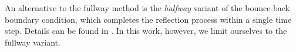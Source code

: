 An alternative to the fullway method is the \textit{halfway} variant of the bounce-back boundary condition, which completes the reflection process within a single time step. Details can be found in \cite{Kruger}. In this work, however, we limit ourselves to the fullway variant.


%

